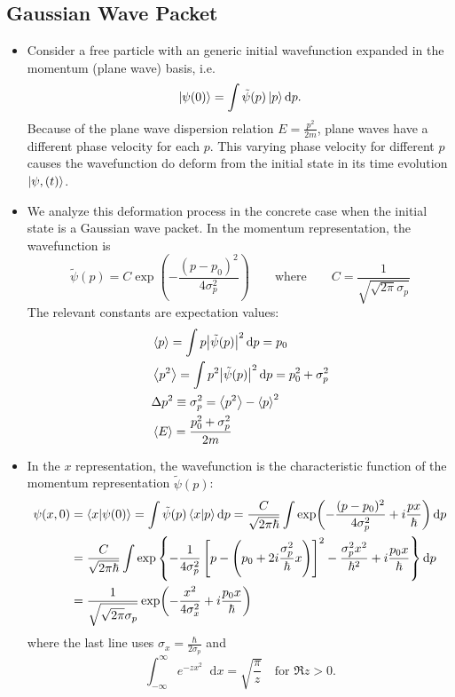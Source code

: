 \documentclass[11pt, a4paper]{article}
\newcommand{\diff}{\mathop{}\!\mathrm{d}} %
\newcommand{\eqtext}[1]{\qquad \text{#1} \qquad}
\renewcommand{\t}[1]{\tilde{#1}}
\newcommand{\p}{\psi}  %
\renewcommand{\k}[1]{\ket{#1}}
\begin{document}
\subsection{Gaussian Wave Packet}
\begin{itemize}
	\item Consider a free particle with an generic initial wavefunction expanded in the momentum (plane wave) basis, i.e.
	\begin{equation*}
		\k{\p(0)} = \int \tilde{\p}(p)\ket{p}\diff p.
	\end{equation*}
	Because of the plane wave dispersion relation $ E = \frac{p^{2}}{2m} $, plane waves have a different phase velocity for each $ p $. This varying phase velocity for different $ p $ causes the wavefunction do deform from the initial state in its time evolution $ \ket{\p, (t)} $.
	
	\item We analyze this deformation process in the concrete case when the initial state is a Gaussian wave packet. In the momentum representation, the wavefunction is
	\begin{equation*}
		\tilde{\p}(p) = C\exp(-\frac{(p-p_{0})^{2}}{4\sigma_{p}^{2}}) \eqtext{where} C = \frac{1}{\sqrt{\sqrt{2\pi}\sigma_{p}}}
	\end{equation*}
	The relevant constants are expectation values:
	\begin{align*}
		& \ev{p} = \int p \abs{\tilde{\p}(p)}^{2}\diff p = p_{0}\\
		& \ev{p^{2}} = \int p^{2}\abs{\t{\p}(p)}^{2}\diff p = p_{0}^{2} + \sigma_{p}^{2}\\
		&\Delta p^{2} \equiv \sigma_{p}^{2} = \ev{p^{2}} - \ev{p}^{2} \\
		&\ev{E} = \frac{p_{0}^{2}+\sigma_{p}^{2}}{2m}
	\end{align*}
	
	\item In the $ x $ representation, the wavefunction is the characteristic function of the momentum representation $ \t{\p}(p) $:
	\begin{align*}
		\p(x, 0) &= \braket{x}{\p(0)} = \int \t{\p}(p)\braket{x}{p}\diff p = \frac{C}{\sqrt{2\pi \hbar}}\int \exp(-\frac{(p-p_{0})^{2}}{4\sigma_{p}^{2}} + i \frac{px}{\hbar})\diff p\\
		& = \frac{C}{\sqrt{2\pi \hbar}} \int \exp\left\{ -\frac{1}{4\sigma_{p}^{2}} \left[p - \left(p_{0} + 2i\frac{\sigma_{p}^{2}}{\hbar}x\right) \right]^{2} - \frac{\sigma_{p}^{2}x^{2}}{\hbar^{2}} + i \frac{p_{0}x}{\hbar} \right\}\diff p\\
		& =  \frac{1}{\sqrt{\sqrt{2\pi}\sigma_{p}}} \exp(-\frac{x^{2}}{4\sigma_{x}^{2}} + i\frac{p_{0}x}{\hbar})
	\end{align*}
	where the last line uses $ \sigma_{x} = \frac{\hbar}{2\sigma_{p}} $ and 
	\begin{equation*}
		\int_{-\infty}^{\infty} e^{-zx^{2}}\diff x = \sqrt{\frac{\pi}{z}} \quad \text{for } \Re z > 0.
	\end{equation*}
	

\end{itemize}
\end{document}
